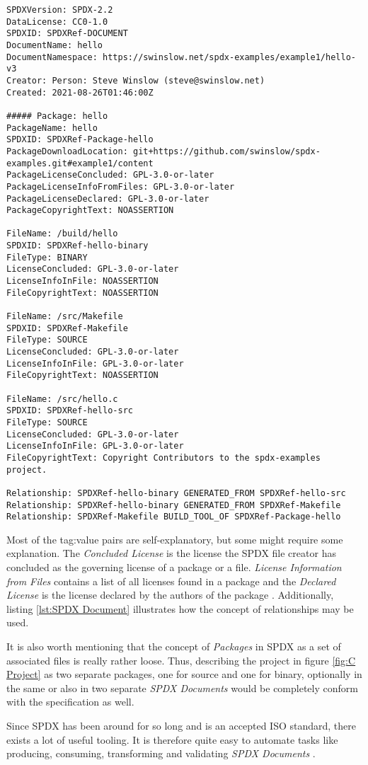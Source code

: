 \noindent
\begin{lstlisting}[basicstyle=\tiny, caption=SPDX Document, captionpos=b, label=lst:SPDX Document]
SPDXVersion: SPDX-2.2
DataLicense: CC0-1.0
SPDXID: SPDXRef-DOCUMENT
DocumentName: hello
DocumentNamespace: https://swinslow.net/spdx-examples/example1/hello-v3
Creator: Person: Steve Winslow (steve@swinslow.net)
Created: 2021-08-26T01:46:00Z

##### Package: hello
PackageName: hello
SPDXID: SPDXRef-Package-hello
PackageDownloadLocation: git+https://github.com/swinslow/spdx-examples.git#example1/content
PackageLicenseConcluded: GPL-3.0-or-later
PackageLicenseInfoFromFiles: GPL-3.0-or-later
PackageLicenseDeclared: GPL-3.0-or-later
PackageCopyrightText: NOASSERTION

FileName: /build/hello
SPDXID: SPDXRef-hello-binary
FileType: BINARY
LicenseConcluded: GPL-3.0-or-later
LicenseInfoInFile: NOASSERTION
FileCopyrightText: NOASSERTION

FileName: /src/Makefile
SPDXID: SPDXRef-Makefile
FileType: SOURCE
LicenseConcluded: GPL-3.0-or-later
LicenseInfoInFile: GPL-3.0-or-later
FileCopyrightText: NOASSERTION

FileName: /src/hello.c
SPDXID: SPDXRef-hello-src
FileType: SOURCE
LicenseConcluded: GPL-3.0-or-later
LicenseInfoInFile: GPL-3.0-or-later
FileCopyrightText: Copyright Contributors to the spdx-examples project.

Relationship: SPDXRef-hello-binary GENERATED_FROM SPDXRef-hello-src
Relationship: SPDXRef-hello-binary GENERATED_FROM SPDXRef-Makefile
Relationship: SPDXRef-Makefile BUILD_TOOL_OF SPDXRef-Package-hello
\end{lstlisting}

\noindent
Most of the tag:value pairs are self-explanatory, but some might require some explanation. The \textit{Concluded License} is the license the SPDX file creator has concluded as the governing license of a package or a file. \textit{License Information from Files} contains a list of all licenses found in a package and the \textit{Declared License} is the license declared by the authors of the package \cite{SPDXSpec}. Additionally, listing \ref{lst:SPDX Document} illustrates how the concept of relationships may be used.\par
It is also worth mentioning that the concept of \textit{Packages} in SPDX as a set of associated files is really rather loose. Thus, describing the project in figure \ref{fig:C Project} as two separate packages, one for source and one for binary, optionally in the same or also in two separate \textit{SPDX Documents} would be completely conform with the specification as well.\par
Since SPDX has been around for so long and is an accepted ISO standard, there exists a lot of useful tooling. It is therefore quite easy to automate tasks like producing, consuming, transforming and validating \textit{SPDX Documents} \cite{SPDXWebsite}.\\
 
